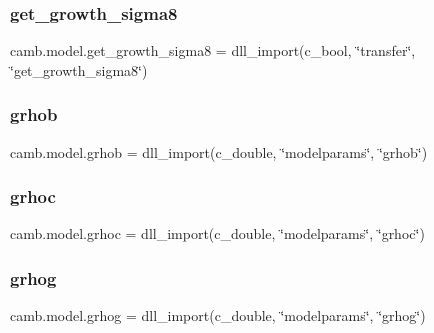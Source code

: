 \subsubsection{\texorpdfstring{get\+\_\+growth\+\_\+sigma8}{get\_growth\_sigma8}}
{\footnotesize\ttfamily camb.\+model.\+get\+\_\+growth\+\_\+sigma8 = dll\+\_\+import(c\+\_\+bool, \char`\"{}transfer\char`\"{}, \char`\"{}get\+\_\+growth\+\_\+sigma8\char`\"{})}

\mbox{\label{namespacecamb_1_1model_aa74d5bdefd9c9f2c8b5cb678991c3321}} 
\subsubsection{\texorpdfstring{grhob}{grhob}}
{\footnotesize\ttfamily camb.\+model.\+grhob = dll\+\_\+import(c\+\_\+double, \char`\"{}modelparams\char`\"{}, \char`\"{}grhob\char`\"{})}

\mbox{\label{namespacecamb_1_1model_ad26ec37a48f754a1995f5e552c3fa20b}} 
\subsubsection{\texorpdfstring{grhoc}{grhoc}}
{\footnotesize\ttfamily camb.\+model.\+grhoc = dll\+\_\+import(c\+\_\+double, \char`\"{}modelparams\char`\"{}, \char`\"{}grhoc\char`\"{})}

\mbox{\label{namespacecamb_1_1model_afc692d0dfcb8c658f757e3aa2ba2a75a}} 
\subsubsection{\texorpdfstring{grhog}{grhog}}
{\footnotesize\ttfamily camb.\+model.\+grhog = dll\+\_\+import(c\+\_\+double, \char`\"{}modelparams\char`\"{}, \char`\"{}grhog\char`\"{})}

\mbox{\label{namespacecamb_1_1model_ab5600680d4e6b2d92352832db9330d27}} 
